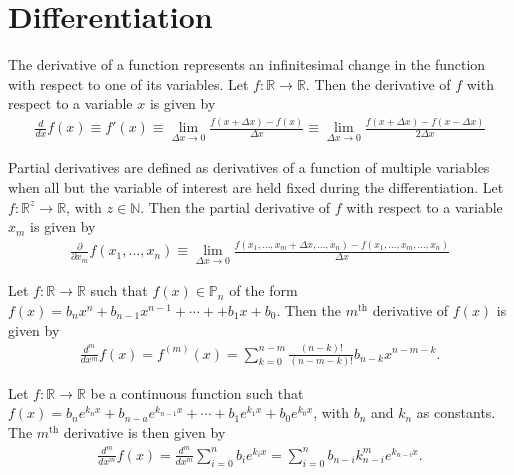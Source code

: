 \section{Differentiation}
\begin{defn}{1}
	The derivative of a function represents an infinitesimal change in the function with respect to one of its variables. Let $f:\mathbb{R}\rightarrow\mathbb{R}$. Then the derivative of $f$ with respect to a variable $x$ is given by
	\begin{align}
	\frac{d}{dx}f(x)\equiv f'(x) \equiv\lim\limits_{\Delta x \rightarrow 0}\frac{f(x+\Delta x)-f(x)}{\Delta x} \equiv \lim\limits_{\Delta x \rightarrow 0}\frac{f(x+\Delta x)-f(x-\Delta x)}{2\Delta x}
	\end{align}
\end{defn} 
\begin{defn}{1}
	Partial derivatives are defined as derivatives of a function of multiple variables when all but the variable of interest are held fixed during the differentiation. Let $f:\mathbb{R}^z\rightarrow\mathbb{R}$, with $z \in \mathbb{N}$. Then the partial derivative of $f$ with respect to a variable $x_m$ is given by
	\begin{align}
	\frac{\partial}{\partial x_m}f(x_1,\dots,x_n) \equiv \lim\limits_{\Delta x \rightarrow 0}\frac{f(x_1,\dots,x_m+\Delta x, \dots,x_n)-f(x_1,\dots,x_m,\dots,x_n)}{\Delta x}
	\end{align}
\end{defn}
\begin{fancybox}{}
	Let $f:\mathbb{R}\rightarrow\mathbb{R}$ such that $f(x)\in\mathbb{P}_n$ of the form $f(x)=b_nx^n+b_{n-1}x^{n-1}+\cdots++b_1x+b_0$. Then the $m^{\textrm{th}}$ derivative of $f(x)$ is given by
	\begin{align}
	\frac{d^m}{dx^m}f(x)=f^{(m)}(x)=\sum_{k=0}^{n-m}\frac{(n-k)!}{(n-m-k)!}b_{n-k}x^{n-m-k}.
	\end{align}
\end{fancybox}
\begin{fancybox}{}
	Let $f:\mathbb{R}\rightarrow\mathbb{R}$ be a continuous function such that $f(x)=b_n e^{k_n x}+b_{n-a}e^{k_{n-1}x}+\cdots+b_1e^{k_1x}+b_0e^{k_0x}$, with $b_n$ and $k_n$ as constants. The $m^\textrm{th}$ derivative is then given by
	\begin{align}
	\frac{d^m}{dx^m}f(x)=\frac{d^m}{dx^m}\sum_{i=0}^{n}b_ie^{k_ix}=\sum_{i=0}^{n}b_{n-i} k_{n-i}^m e^{k_{n-i} x}.
	\end{align}
\end{fancybox}

